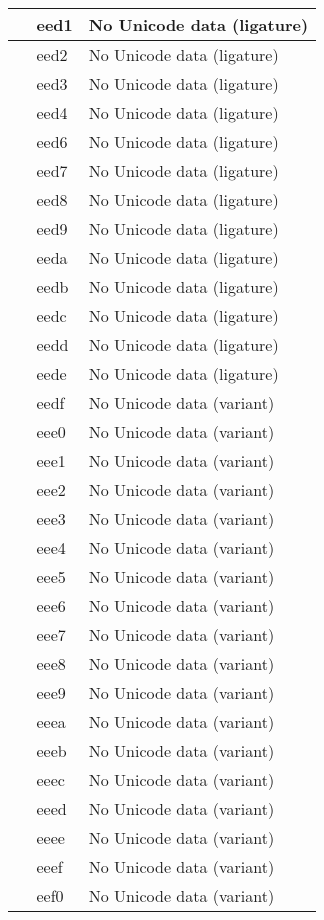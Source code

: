 \documentclass[12pt,letterpaper,openany]{book}
\begin{document}
\begin{center}
\begin{supertabular}{|m{0.25in}|m{0.5in}|m{4in}|}
 & eed1 & No Unicode data (ligature)\\\hline
 & eed2 & No Unicode data (ligature)\\\hline
 & eed3 & No Unicode data (ligature)\\\hline
 & eed4 & No Unicode data (ligature)\\\hline
 & eed6 & No Unicode data (ligature)\\\hline
 & eed7 & No Unicode data (ligature)\\\hline
 & eed8 & No Unicode data (ligature)\\\hline
 & eed9 & No Unicode data (ligature)\\\hline
 & eeda & No Unicode data (ligature)\\\hline
 & eedb & No Unicode data (ligature)\\\hline
 & eedc & No Unicode data (ligature)\\\hline
 & eedd & No Unicode data (ligature)\\\hline
 & eede & No Unicode data (ligature)\\\hline
 & eedf & No Unicode data (variant)\\\hline
 & eee0 & No Unicode data (variant)\\\hline
 & eee1 & No Unicode data (variant)\\\hline
 & eee2 & No Unicode data (variant)\\\hline
 & eee3 & No Unicode data (variant)\\\hline
 & eee4 & No Unicode data (variant)\\\hline
 & eee5 & No Unicode data (variant)\\\hline
 & eee6 & No Unicode data (variant)\\\hline
 & eee7 & No Unicode data (variant)\\\hline
 & eee8 & No Unicode data (variant)\\\hline
 & eee9 & No Unicode data (variant)\\\hline
 & eeea & No Unicode data (variant)\\\hline
 & eeeb & No Unicode data (variant)\\\hline
 & eeec & No Unicode data (variant)\\\hline
 & eeed & No Unicode data (variant)\\\hline
 & eeee & No Unicode data (variant)\\\hline
 & eeef & No Unicode data (variant)\\\hline
 & eef0 & No Unicode data (variant)\\\hline

\end{supertabular}
\end{center}
\end{document}
